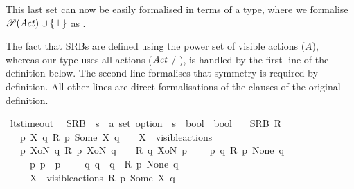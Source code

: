 \begin{isabellebody}
\begin{isamarkuptext}
This last set can now be easily formalised in terms of a type, where we formalise
$\mathscr{P}(\mathit{Act}) \cup \{\bot\}$
as .

The fact that SRBs are defined using the power set of visible actions ($A$), whereas our type uses all actions ($\mathit{Act}$ / ), is handled by the first line of the definition below. The second line formalises that symmetry is required by definition. All other lines are direct formalisations of the clauses of the original definition.
\pagebreak%
\end{isamarkuptext}\isamarkuptrue%
\isamarkupfalse%
\ lts{\isacharunderscore}{\kern0pt}timeout\ \isanewline
\isanewline
%
\isanewline
{}\isamarkupfalse%
\ SRB\ {\isacharcolon}{\kern0pt}{\isacharcolon}{\kern0pt}\ {\isacartoucheopen}{\isacharparenleft}{\kern0pt}{\isacharprime}{\kern0pt}s\ {\isasymRightarrow}\ {\isacharprime}{\kern0pt}a\ set\ option\ {\isasymRightarrow}\ {\isacharprime}{\kern0pt}s\ {\isasymRightarrow}\ bool{\isacharparenright}{\kern0pt}\ {\isasymRightarrow}\ bool{\isacartoucheclose}\isanewline
\ \ \ {\isacartoucheopen}SRB\ R\ {\isasymequiv}\isanewline
\ \ {\isacharparenleft}{\kern0pt}{\isasymforall}\ p\ X\ q{\isachardot}{\kern0pt}\ R\ p\ {\isacharparenleft}{\kern0pt}Some\ X{\isacharparenright}{\kern0pt}\ q\ \ {\isasymlongrightarrow}\ \ X\ {\isasymsubseteq}\ visible{\isacharunderscore}{\kern0pt}actions{\isacharparenright}{\kern0pt}\ {\isasymand}\isanewline
\ \ {\isacharparenleft}{\kern0pt}{\isasymforall}\ p\ XoN\ q{\isachardot}{\kern0pt}\ R\ p\ XoN\ q\ \ {\isasymlongrightarrow}\ \ R\ q\ XoN\ p{\isacharparenright}{\kern0pt}\ {\isasymand}\isanewline
\isanewline
\ \ {\isacharparenleft}{\kern0pt}{\isasymforall}\ p\ q{\isachardot}{\kern0pt}\ R\ p\ None\ q\ {\isasymlongrightarrow}\isanewline
\ \ \ \ {\isacharparenleft}{\kern0pt}{\isasymforall}\ p{\isacharprime}{\kern0pt}{\isachardot}{\kern0pt}\ p\ {\isasymlongmapsto}{\isasymtau}\ p{\isacharprime}{\kern0pt}\ \ {\isasymlongrightarrow}\ \ {\isacharparenleft}{\kern0pt}{\isasymexists}\ q{\isacharprime}{\kern0pt}{\isachardot}{\kern0pt}\ {\isacharparenleft}{\kern0pt}q\ {\isasymlongmapsto}{\isasymtau}\ q{\isacharprime}{\kern0pt}{\isacharparenright}{\kern0pt}\ {\isasymand}\ R\ p{\isacharprime}{\kern0pt}\ None\ q{\isacharprime}{\kern0pt}{\isacharparenright}{\kern0pt}{\isacharparenright}{\kern0pt}\ {\isasymand}\isanewline
\ \ \ \ {\isacharparenleft}{\kern0pt}{\isasymforall}\ X\ {\isasymsubseteq}\ visible{\isacharunderscore}{\kern0pt}actions{\isachardot}{\kern0pt}\ {\isacharparenleft}{\kern0pt}R\ p\ {\isacharparenleft}{\kern0pt}Some\ X{\isacharparenright}{\kern0pt}\ q{\isacharparenright}{\kern0pt}{\isacharparenright}{\kern0pt}{\isacharparenright}{\kern0pt}\ {\isasymand}\isanewline

\end{isabellebody}
